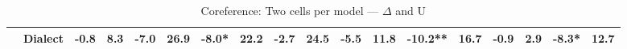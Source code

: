 \begin{table}[h]
{\begin{tabular}{llrrrrrrrrrrrrrrrr}
  & \textbf{Dialect} & \cellcolor{red!1} -0.8 & \cellcolor{blue!6} 8.3 & \cellcolor{red!14} \textbf{-7.0} & \cellcolor{blue!21} 26.9 & \cellcolor{red!16} \textbf{-8.0}* & \cellcolor{blue!17} 22.2 & \cellcolor{red!5} -2.7 & \cellcolor{blue!19} 24.5 & \cellcolor{red!11} \textbf{-5.5} & \cellcolor{blue!9} 11.8 & \cellcolor{red!20} \textbf{-10.2}** & \cellcolor{blue!13} 16.7 & \cellcolor{red!1} -0.9 & \cellcolor{blue!2} 2.9 & \cellcolor{red!16} \textbf{-8.3}* & \cellcolor{blue!10} 12.7 \\
\bottomrule
\end{tabular}}
\caption{Coreference: Two cells per model — $\Delta$ and U}\label{tab:coref_combined_cells}
\end{table}